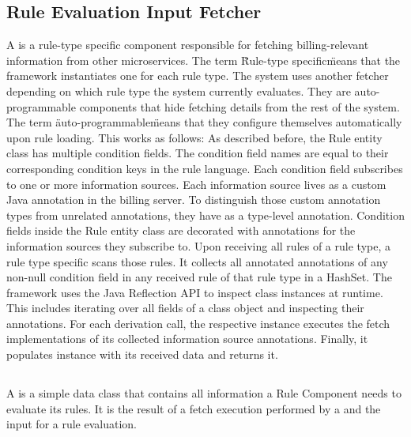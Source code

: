 \subsection{Rule Evaluation Input Fetcher}\label{subsec:rule-evaluation-input-fetcher}
A \REIF is a rule-type specific component responsible for fetching billing-relevant information from other \AV microservices.
The term \"Rule-type specific\" means that the framework instantiates one \REIF for each rule type.
The system uses another fetcher depending on which rule type the system currently evaluates.
They are auto-programmable components that hide fetching details from the rest of the system.
The term \"auto-programmable\" means that they configure themselves automatically upon rule loading.
This works as follows: As described before, the Rule entity class has multiple condition fields.
The condition field names are equal to their corresponding condition keys in the rule language.
Each condition field subscribes to one or more information sources.
Each information source lives as a custom Java annotation in the billing server.
To distinguish those custom annotation types from unrelated annotations, they have  as a type-level annotation.
Condition fields inside the Rule entity class are decorated with annotations for the information sources they subscribe to.
Upon receiving all rules of a rule type, a rule type specific  scans those rules.
It collects all  annotated annotations of any non-null condition field in any received rule of that rule type in a HashSet.
The framework uses the Java Reflection API to inspect class instances at runtime.
This includes iterating over all fields of a class object and inspecting their annotations.
For each derivation call, the respective  instance executes the fetch implementations of its collected information source annotations.
Finally, it populates \REI instance with its received data and returns it.

\subsection{\REI}\label{subsec:rei}
A \REI is a simple data class that contains all information a Rule Component needs to evaluate its rules.
It is the result of a fetch execution performed by a \REIF and the input for a rule evaluation.

